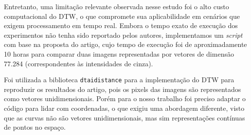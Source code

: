 Entretanto, uma limitação relevante observada nesse estudo foi o alto custo computacional do DTW, o que compromete sua aplicabilidade em cenários que exigem processamento em tempo real. Embora o tempo exato de execução dos experimentos não tenha sido reportado pelos autores, implementamos um \textit{script} com base na proposta do artigo, cujo tempo de execução foi de aproximadamente 10 horas para comparar duas imagens representadas por vetores de dimensão 77.284 (correspondentes às intensidades de cinza). 

Foi utilizada a biblioteca \texttt{dtaidistance}  \cite{libDTW} para a implementação do DTW para reproduzir os resultados do artigo, pois os pixels das imagens são representados como vetores unidimensionais. Porém para o nosso trabalho foi preciso adaptar o código para lidar com coordenadas, o que exigiu uma abordagem diferente, visto que as curvas não são vetores unidimensionais, mas sim representações contínuas de pontos no espaço.

